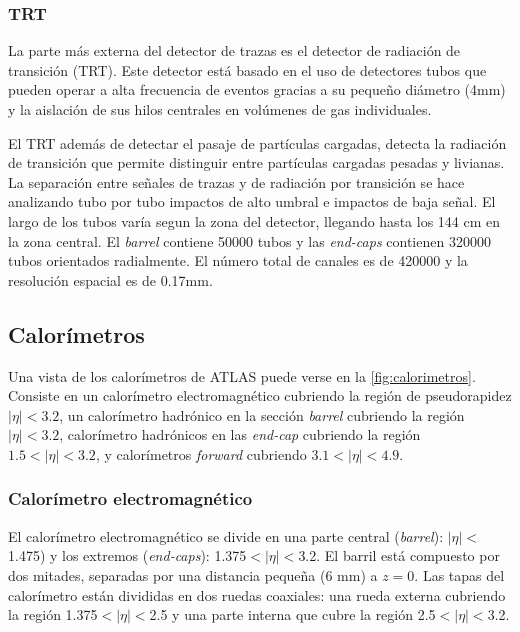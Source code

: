 \subsubsection{TRT}

La parte más externa del detector de trazas es el detector de radiación de
transición (TRT). Este detector está basado en el uso de detectores tubos que
pueden operar a alta frecuencia de eventos gracias a su pequeño diámetro (4mm) y
la aislación de sus hilos centrales en volúmenes de gas individuales.

El TRT además de detectar el pasaje de partículas cargadas, detecta la radiación
de transición que permite distinguir entre partículas cargadas pesadas y
livianas. La separación entre señales de trazas y de radiación por transición se
hace analizando tubo por tubo impactos de alto umbral e impactos de baja señal.
El largo de los tubos varía segun la zona del detector, llegando hasta los 144
cm en la zona central. El \emph{barrel} contiene 50000 tubos y las \emph{end-caps} contienen
320000 tubos orientados radialmente. El número total de canales es de 420000 y
la resolución espacial es de 0.17mm.


\subsection{Calorímetros}

Una vista de los calorímetros de ATLAS puede verse en la \cref{fig:calorimetros}.
Consiste en un calorímetro electromagnético cubriendo la región de pseudorapidez
$|\eta| < 3.2$, un calorímetro hadrónico en la sección \emph{barrel} cubriendo
la región $|\eta| < 3.2$, calorímetro hadrónicos en las \emph{end-cap} cubriendo
la región $1.5 < |\eta| < 3.2$, y calorímetros \emph{forward} cubriendo $3.1 <
|\eta| < 4.9$.


\subsubsection{Calorímetro electromagnético}

El calorímetro electromagnético \cite{caloemTDR} se divide en una parte central
(\emph{barrel}): $|\eta|<$1.475) y los extremos (\emph{end-caps}):
1.375$<|\eta|<$3.2. El barril está compuesto por dos mitades, separadas por una
distancia pequeña (6 mm) a $z = 0$. Las tapas del calorímetro están divididas en
dos ruedas coaxiales: una rueda externa cubriendo la región 1.375$<|\eta|<$2.5 y
una parte interna que cubre la región 2.5$<|\eta|<$3.2.

